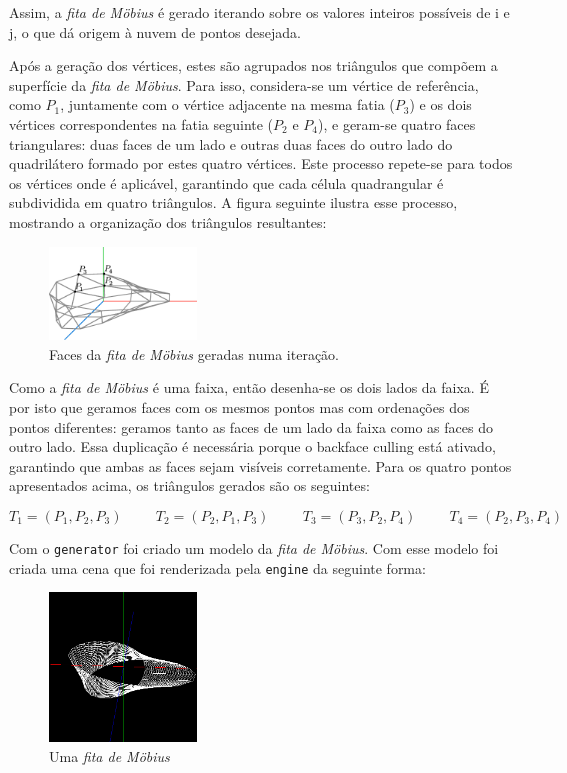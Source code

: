 \documentclass[12pt, a4paper]{article}
\begin{document}
Assim, a \emph{fita de Möbius} é gerado iterando sobre os valores inteiros possíveis de i e j,
o que dá origem à nuvem de pontos desejada.

Após a geração dos vértices, estes são agrupados nos triângulos que compõem a superfície da
\emph{fita de Möbius}.
Para isso, considera-se um vértice de referência, como $P_1$, juntamente com o vértice
adjacente na mesma fatia ($P_3$) e os dois vértices correspondentes na fatia seguinte
($P_2$ e $P_4$), e geram-se quatro faces triangulares: duas faces de um lado e outras duas
faces do outro lado do quadrilátero formado por estes quatro vértices. Este processo
repete-se para todos os vértices onde é aplicável, garantindo que cada célula quadrangular
é subdividida em quatro triângulos. A figura seguinte ilustra esse processo, mostrando
a organização dos triângulos resultantes:

\begin{figure}[H]
    \centering
    \includegraphics[width=0.35\textwidth]{res/phase2/figures/MobiusStrip.pdf}
    \caption{Faces da \emph{fita de Möbius} geradas numa iteração.}
\end{figure}

Como a \emph{fita de Möbius} é uma faixa, então desenha-se os dois lados da faixa. É por
isto que geramos faces com os mesmos pontos mas com ordenações dos pontos diferentes:
geramos tanto as faces de um lado da faixa como as faces do outro lado. Essa duplicação é
necessária porque o backface culling está ativado, garantindo que ambas as faces sejam
visíveis corretamente. Para os quatro pontos apresentados acima, os triângulos gerados
são os seguintes:

$$
T_1 = (P_1, P_2, P_3)
\hspace{1cm}
T_2 = (P_2, P_1, P_3)
\hspace{1cm}
T_3 = (P_3, P_2, P_4)
\hspace{1cm}
T_4 = (P_2, P_3, P_4)
$$

Com o \texttt{generator} foi criado um modelo da \emph{fita de Möbius}. Com esse modelo
foi criada uma cena que foi renderizada pela \texttt{engine} da seguinte forma:

\begin{figure}[H]
    \centering
    \includegraphics[width=0.35\textwidth]{res/phase2/figures/MobiusStrip.png}
    \caption{Uma \emph{fita de Möbius}}
\end{figure}
\end{document}
